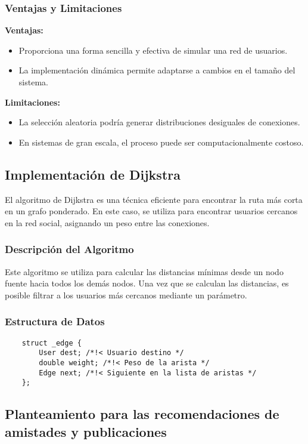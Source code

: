 \documentclass[9pt,letterpaper,onecolumn]{rho-class/rho}
\begin{document}
    \subsubsection{Ventajas y Limitaciones}
    \textbf{Ventajas:}
    \begin{itemize}
        \item Proporciona una forma sencilla y efectiva de simular una red de usuarios.
        \item La implementación dinámica permite adaptarse a cambios en el tamaño del sistema.
    \end{itemize}
    \textbf{Limitaciones:}
    \begin{itemize}
        \item La selección aleatoria podría generar distribuciones desiguales de conexiones.
        \item En sistemas de gran escala, el proceso puede ser computacionalmente costoso.
    \end{itemize}

    \subsection{Implementación de Dijkstra}
    El algoritmo de Dijkstra es una técnica eficiente para encontrar la ruta más corta en un grafo ponderado.
    En este caso, se utiliza para encontrar usuarios cercanos en la red social, asignando un peso entre las conexiones. 

    \subsubsection{Descripción del Algoritmo}
    Este algoritmo se utiliza para calcular las distancias mínimas desde un nodo fuente hacia todos los demás nodos. 
    Una vez que se calculan las distancias, es posible filtrar a los usuarios más cercanos mediante un parámetro.

    \subsubsection{Estructura de Datos}
    \begin{verbatim}
    struct _edge {
        User dest; /*!< Usuario destino */
        double weight; /*!< Peso de la arista */
        Edge next; /*!< Siguiente en la lista de aristas */
    };
    \end{verbatim}


    \subsection{Planteamiento para las recomendaciones de amistades y publicaciones}
\end{document}
